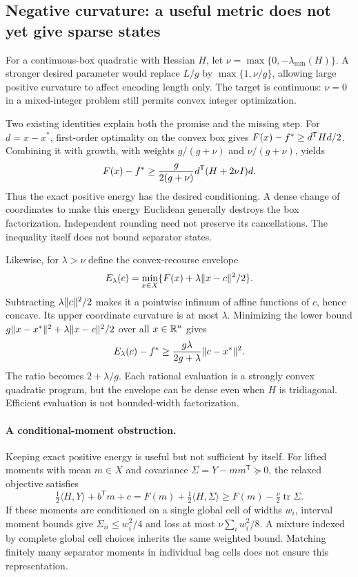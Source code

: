 \subsection{Negative curvature: a useful metric does not yet give sparse states}
For a continuous-box quadratic with Hessian $H$, let
$\nu=\max\{0,-\lambda_{\min}(H)\}$. A stronger desired parameter would
replace $L/g$ by $\max\{1,\nu/g\}$, allowing large positive curvature
to affect encoding length only. The target is continuous: $\nu=0$ in
a mixed-integer problem still permits convex integer optimization.

Two existing identities explain both the promise and the missing step.
For $d=x-x^*$, first-order optimality on the convex box gives
$F(x)-f^*\ge d^{\mathsf T}Hd/2$. Combining it with growth, with
weights $g/(g+\nu)$ and $\nu/(g+\nu)$, yields
\begin{equation}\label{eq:convexenergy}
F(x)-f^*\ge\frac{g}{2(g+\nu)}
d^{\mathsf T}(H+2\nu I)d.
\end{equation}
Thus the exact positive energy has the desired conditioning. A dense
change of coordinates to make this energy Euclidean generally destroys
the box factorization. Independent rounding need not preserve its
cancellations. The inequality itself does not bound separator states.

Likewise, for $\lambda>\nu$ define the convex-recourse envelope
\[
E_\lambda(c)=\min_{x\in X}
\{F(x)+\lambda\lVert x-c\rVert^2/2\}.
\]
Subtracting $\lambda\lVert c\rVert^2/2$ makes it a pointwise infimum of affine
functions of $c$, hence concave. Its upper coordinate curvature is at
most $\lambda$. Minimizing the lower bound
$g\lVert x-x^*\rVert^2+\lambda\lVert x-c\rVert^2/2$ over all $x\in\mathbb R^n$ gives
\[
E_\lambda(c)-f^*\ge\frac{g\lambda}{2g+\lambda}\lVert c-x^*\rVert^2.
\]
The ratio becomes $2+\lambda/g$. Each rational evaluation is a strongly
convex quadratic program, but the envelope can be dense even when $H$
is tridiagonal. Efficient evaluation is not bounded-width factorization.

\paragraph{A conditional-moment obstruction.}
Keeping exact positive energy is useful but not sufficient by itself.
For lifted moments with mean $m\in X$ and covariance
$\Sigma=Y-mm^{\mathsf T}\succeq0$, the relaxed objective satisfies
\[
\tfrac12\langle H,Y\rangle+b^{\mathsf T}m+c
=F(m)+\tfrac12\langle H,\Sigma\rangle
\ge F(m)-\tfrac\nu2\operatorname{tr}\Sigma.
\]
If these moments are conditioned on a single global cell of widths $w_i$,
interval moment bounds give $\Sigma_{ii}\le w_i^2/4$ and loss at most
$\nu\sum_iw_i^2/8$. A mixture indexed by complete global cell choices
inherits the same weighted bound. Matching finitely many separator
moments in individual bag cells does not ensure this representation.


